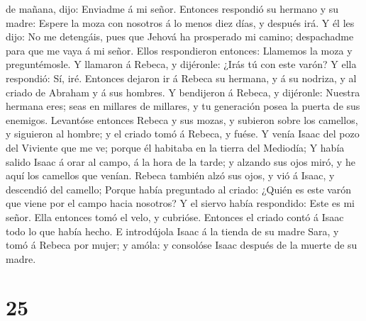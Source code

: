 de mañana, dijo: Enviadme á mi señor.  Entonces respondió
su hermano y su madre: Espere la moza con nosotros á lo menos diez días,
y después irá.  Y él les dijo: No me detengáis, pues que
Jehová ha prosperado mi camino; despachadme para que me vaya á mi señor.
 Ellos respondieron entonces: Llamemos la moza y
preguntémosle.  Y llamaron á Rebeca, y dijéronle: ¿Irás
tú con este varón? Y ella respondió: Sí, iré.  Entonces
dejaron ir á Rebeca su hermana, y á su nodriza, y al criado de Abraham y
á sus hombres.  Y bendijeron á Rebeca, y dijéronle:
Nuestra hermana eres; seas en millares de millares, y tu generación
posea la puerta de sus enemigos.  Levantóse entonces
Rebeca y sus mozas, y subieron sobre los camellos, y siguieron al
hombre; y el criado tomó á Rebeca, y fuése.  Y venía
Isaac del pozo del Viviente que me ve; porque él habitaba en la tierra
del Mediodía;  Y había salido Isaac á orar al campo, á la
hora de la tarde; y alzando sus ojos miró, y he aquí los camellos que
venían.  Rebeca también alzó sus ojos, y vió á Isaac, y
descendió del camello;  Porque había preguntado al
criado: ¿Quién es este varón que viene por el campo hacia nosotros? Y el
siervo había respondido: Este es mi señor. Ella entonces tomó el velo, y
cubrióse.  Entonces el criado contó á Isaac todo lo que
había hecho.  E introdújola Isaac á la tienda de su madre
Sara, y tomó á Rebeca por mujer; y amóla: y consolóse Isaac después de
la muerte de su madre.

\hypertarget{section-24}{%
\section{25}\label{section-24}}

